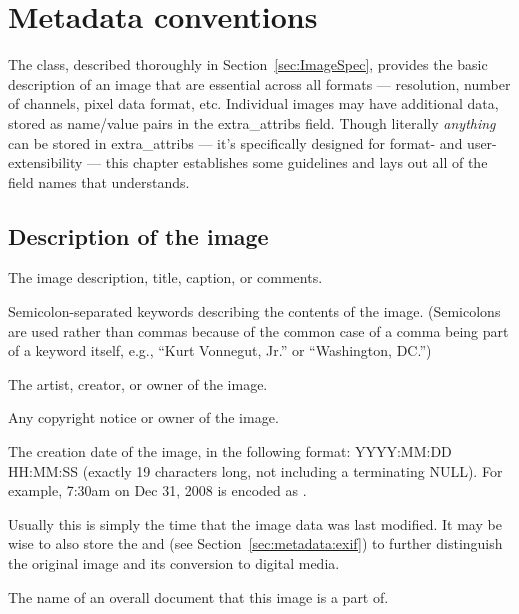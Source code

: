 \chapter{Metadata conventions}
\label{chap:stdmetadata}


The \ImageSpec class, described thoroughly in
Section~\ref{sec:ImageSpec}, provides the basic description of an image
that are essential across all formats --- resolution, number of
channels, pixel data format, etc.  Individual images may have additional
data, stored as name/value pairs in the {\cf extra_attribs} field.
Though literally \emph{anything} can be stored in {\cf extra_attribs}
--- it's specifically designed for format- and user-extensibility ---
this chapter establishes some guidelines and lays out all of the field
names that \product understands.


\section{Description of the image}

The image description, title, caption, or comments.
\apiend


Semicolon-separated keywords describing the contents of the image.
(Semicolons are used rather than commas because of the common case
of a comma being part of a keyword itself, e.g., ``Kurt Vonnegut, Jr.''
or ``Washington, DC.'')
\apiend

The artist, creator, or owner of the image.
\apiend

Any copyright notice or owner of the image.
\apiend

The creation date of the image, in the following format: {\cf YYYY:MM:DD
  HH:MM:SS} (exactly 19 characters long, not including a terminating
NULL).  For example, 7:30am on Dec
31, 2008 is encoded as .

Usually this is simply the time that the image data was last modified.
It may be wise to also store the  and
 (see Section~\ref{sec:metadata:exif})
to further distinguish the original image and its conversion to digital
media.
\apiend

The name of an overall document that this image is a part of.
\apiend

